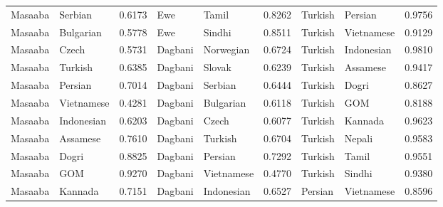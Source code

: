\documentclass[11pt]{article} %
\begin{document}
\begin{table}
\begin{tabular}{llr@{\hspace{12pt}}llr@{\hspace{12pt}}llr}
            Masaaba                      & Serbian             & 0.6173        & Ewe                 & Tamil               & 0.8262        & Turkish             & Persian             & 0.9756        \\
            Masaaba                      & Bulgarian           & 0.5778        & Ewe                 & Sindhi              & 0.8511        & Turkish             & Vietnamese          & 0.9129        \\
            Masaaba                      & Czech               & 0.5731        & Dagbani             & Norwegian           & 0.6724        & Turkish             & Indonesian          & 0.9810        \\
            Masaaba                      & Turkish             & 0.6385        & Dagbani             & Slovak              & 0.6239        & Turkish             & Assamese            & 0.9417        \\
            Masaaba                      & Persian             & 0.7014        & Dagbani             & Serbian             & 0.6444        & Turkish             & Dogri               & 0.8627        \\
            Masaaba                      & Vietnamese          & 0.4281        & Dagbani             & Bulgarian           & 0.6118        & Turkish             & GOM                 & 0.8188        \\
            Masaaba                      & Indonesian          & 0.6203        & Dagbani             & Czech               & 0.6077        & Turkish             & Kannada             & 0.9623        \\
            Masaaba                      & Assamese            & 0.7610        & Dagbani             & Turkish             & 0.6704        & Turkish             & Nepali              & 0.9583        \\
            Masaaba                      & Dogri               & 0.8825        & Dagbani             & Persian             & 0.7292        & Turkish             & Tamil               & 0.9551        \\
            Masaaba                      & GOM                 & 0.9270        & Dagbani             & Vietnamese          & 0.4770        & Turkish             & Sindhi              & 0.9380        \\
            Masaaba                      & Kannada             & 0.7151        & Dagbani             & Indonesian          & 0.6527        & Persian             & Vietnamese          & 0.8596        \\

\end{tabular}
\end{table}
\end{document}
